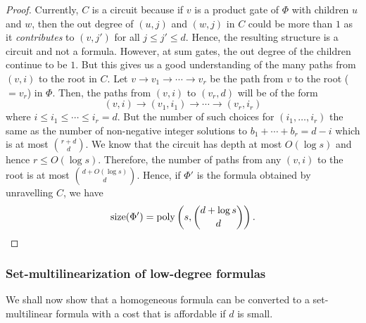 \begin{proof}
\medskip

Currently, $C$ is a circuit because if $v$ is a product gate of $\Phi$ with children $u$ and $w$, then the out degree of $(u, j)$ and $(w, j)$ in $C$ could be more than $1$ as it \emph{contributes} to $(v,j')$ for all $j \leq j' \leq d$.
Hence, the resulting structure is a circuit and not a formula.
However, at sum gates, the out degree of the children continue to be $1$.
But this gives us a good understanding of the many paths from $(v,i)$ to the root in $C$.
Let $v\rightarrow v_1 \rightarrow \cdots \rightarrow v_r$ be the path from $v$ to the root ($=v_r$) in $\Phi$. Then, the paths from $(v,i)$ to $(v_r,d)$ will be of the form
\[
(v,i) \rightarrow (v_1,i_1) \rightarrow \cdots \rightarrow (v_r,i_r)
\]
where $i \leq i_1 \leq \cdots \leq i_r = d$.
But the number of such choices for $(i_1,\ldots, i_r)$ the same as the number of non-negative integer solutions to $b_1 + \cdots + b_r = d-i$ which is at most $\binom{r + d}{d}$.
We know that the circuit has depth at most $O(\log s)$ and hence $r \leq O(\log s)$.
Therefore, the number of paths from any $(v,i)$ to the root is at most $\binom{d + O(\log s)}{d}$.
Hence, if $\Phi'$ is the formula obtained by unravelling $C$, we have
\[
\mathrm{size}(\Phi') = \operatorname{poly}\left(s,\binom{d+\log s}{d}\right).
\]
\end{proof}

\subsubsection*{Set-multilinearization of low-degree formulas}

We shall now show that a homogeneous formula can be converted to a set-multilinear formula with a cost that is affordable if $d$ is small. 

